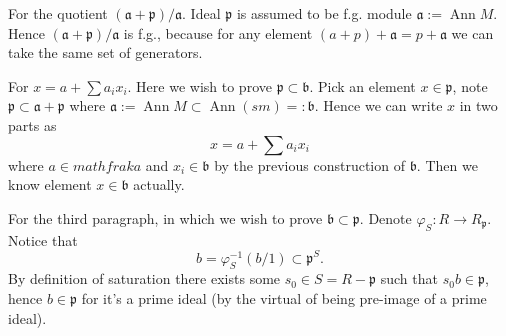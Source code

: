 For the quotient $(\mathfrak a+\mathfrak p)/\mathfrak a$. Ideal $\mathfrak p$ is assumed to be f.g. module $\mathfrak a:=\operatorname{Ann}M$. Hence $(\mathfrak a+\mathfrak p)/\mathfrak a$ is f.g., because for any element $(a+p)+\mathfrak a=p+\mathfrak a$ we can take the same set of generators.

For $x=a+\sum a_ix_i$. Here we wish to prove $\mathfrak p\subset \mathfrak b$. Pick an element $x\in\mathfrak p$, note $\mathfrak p\subset \mathfrak a+\mathfrak p$ where $\mathfrak a := \operatorname{Ann} M \subset \operatorname{Ann}(sm) =: \mathfrak b$. Hence we can write $x$ in two parts as 
\[x= a+\sum a_ix_i\] where $a\in 
mathfrak a$ and $x_i\in \mathfrak b$ by the previous construction of $\mathfrak b$. Then we know element $x\in \mathfrak b$ actually. 

For the third paragraph, in which we wish to prove $\mathfrak b\subset \mathfrak p$. Denote $\varphi_S:R\to R_{\mathfrak p}$. Notice that 
\[b=\varphi_S^{-1}(b/1)\subset \mathfrak p^S.\]By definition of saturation there exists some $s_0\in S=R-\mathfrak p$ such that $s_0b\in \mathfrak p$, hence $b\in\mathfrak p$ for it's a prime ideal (by the virtual of being pre-image of a prime ideal).